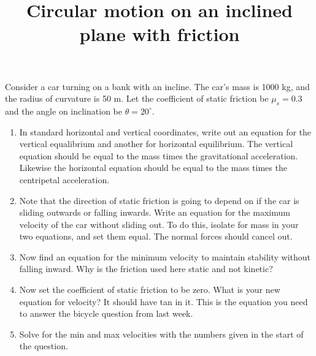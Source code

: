 \documentclass[a4paper,12pt]{article}
\begin{document}
\title {Circular motion on an inclined plane with friction}
\maketitle
		

Consider a car turning on a bank with an incline. The car's mass is 1000 kg, and the radius of curvature is 50 m. Let the coefficient of static friction be $\mu_s = 0.3$ and the angle on inclination be $\theta = 20^\circ $.



\begin{enumerate} 
	\item{In standard horizontal and vertical coordinates, write out an equation for the vertical equalibrium and another for horizontal equilibrium. The vertical equation should be equal to the mass times the gravitational acceleration. Likewise the horizontal equation should be equal to the mass times the centripetal acceleration.}
	\item{Note that the direction of static friction is going to depend on if the car is sliding outwards or falling inwards. Write an equation for the maximum velocity of the car without sliding out. To do this, isolate for mass in your two equations, and set them equal. The normal forces should cancel out.}
	\item{Now find an equation for the minimum velocity to maintain stability without falling inward. Why is the friction used here static and not kinetic?}
	\item{Now set the coefficient of static friction to be zero. What is your new equation for velocity? It should have tan in it. This is the equation you need to answer the bicycle question from last week.}
	\item{Solve for the min and max velocities with the numbers given in the start of the question.}

\end{enumerate}
\end{document}

